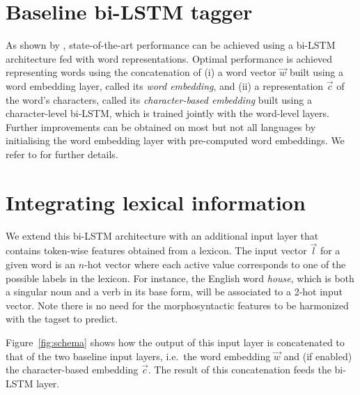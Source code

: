\documentclass[11pt,a4paper]{article}
\newcommand\hm[1]{\textcolor{blue}{#1}}
\newcommand\bs[1]{\textcolor{red}{#1}}
\newcommand\discussion[1]{}
\newcommand\final[1]{#1}
\begin{document}
\section{Baseline bi-LSTM tagger}
\label{sec:baselinearchitecture}
As shown by \citet{plank16}, state-of-the-art performance can be achieved using a bi-LSTM architecture fed with word
representations. Optimal performance is achieved representing words using the concatenation of (i) a word vector
$\vec{w}$ built using a word embedding layer, called its {\em word embedding}, and (ii) a representation $\vec{c}$ of
the word's characters, called its {\em character-based embedding} built using a character-level bi-LSTM, which is
trained jointly with the word-level layers. Further improvements can be obtained on most but not all languages by
initialising the word embedding layer with pre-computed word embeddings. We refer to \citet{plank16} for further details.

\section{Integrating lexical information}

We extend this bi-LSTM architecture with an additional input layer that contains token-wise features obtained from a
lexicon. The input vector $\vec{l}$ for a given word is an $n$-hot vector where each active value corresponds to one of
the possible labels in the lexicon. For instance, the English word \textit{house}, which is both a singular noun and a
verb in its base form, will be associated to a 2-hot input vector.  \discussion{\hm{\textbf{HM I think some reviewers
      didn't like the word agnostic, what about a succint...:} Note there is no need for the morphosyntactic features to
    be harmonized with the tagset to predict.} Note that this way of incorporating lexicon information as new features
  in an input layer is label-set agnostic, and no explicit relation is needed between the morphosyntactic inventory of
  the lexicon and the label set we are aiming at predicting, namely the 17-label UD tagset.\bs{\textbf{BS: Do you
      suggest to replace everything between your comment above and this comment by the text you suggested? Why not after
      all, the idea expressed here is fairly obvious. What do you think?}}}\final{Note there is no need for the
  morphosyntactic features to be harmonized with the tagset to predict.}

Figure~\ref{fig:schema} shows how the output of this input layer is concatenated to that of the two baseline input
layers, i.e.~the word embedding $\vec{w}$ and (if enabled) the character-based embedding $\vec{c}$. The result of this
concatenation feeds the bi-LSTM layer.
\end{document}
